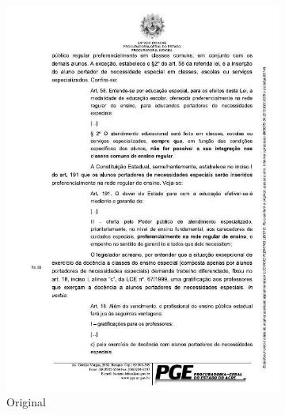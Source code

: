 \begin{figure}[H]
  \centering
  \caption{CycleGAN com 2 épocas.}
  \begin{subfigure}[t]{.3\linewidth}
    \includegraphics[width=\textwidth]{figuras/1004871_310554941_13.jpg}
    \caption{Original}
  \end{subfigure}
  \begin{subfigure}[t]{.3\linewidth}

\end{subfigure}
\end{figure}

